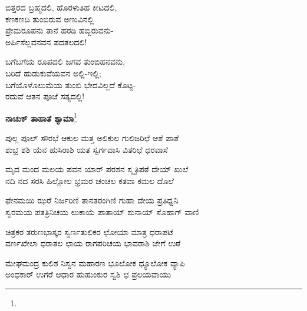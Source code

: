 \begin{myquote}
ಬಿತ್ತರದ ಬ್ರಹ್ಮದಲಿ, ಹೊರಳುತಿಹ ಕೀಟದಲಿ,\\ಕಣಕಣದಿ ತುಂಬಿರುವ ಅಣುವಿನಲ್ಲಿ\\ಪ್ರೇಮರೂಪನು ತಾನೆ ಹರಡಿ ಹಬ್ಬಿರುವನು-\\ಅರ್ಪಿಸೆಲ್ಲವನವನ ಪದತಲದಲಿ!
\end{myquote}

\begin{myquote}
ಬಗೆಬಗೆಯ ರೂಪದಲಿ ಜಗವ ತುಂಬಿಹನವನು,\\ಬರಿದೆ ಹುಡುಕುವೆಯವನ ಅಲ್ಲಿ-ಇಲ್ಲಿ;\\ಬಗೆಯೊಳೊಲುಮೆಯ ತುಂಬಿ ಭೇದವಿಲ್ಲದೆ ಕೊಟ್ಟ-\\ರದುವೆ ಆತನ ಪೂಜೆ ಸತ್ಯದಲ್ಲಿ!
\end{myquote}

\begin{center}
\textbf{ನಾಚುಕ್ ತಾಹಾತೆ ಶ್ಯಾಮಾ}\footnote{}
\end{center}

\begin{myquote}
ಪುಲ್ಲ ಪೂಲ್ ಸೌರಭೆ ಆಕುಲ ಮತ್ತ ಅಲಿಕುಲ ಗುಲಿಜರಿಛೆ ಆಶೆ ಪಾಶೆ\\ಶುಭ್ರ ಶಶಿ ಯೆನ ಹುಸಿರಾಶಿ ಯತ ಸ್ವರ್ಗವಾಸಿ ವಿತರಿಛೆ ಧರವಾಸೆ
\end{myquote}


\begin{myquote}
ಮೃದ ಮಂದ ಮಲಯ ಪವನ ಯಾರ್ ಪರಶನ ಸ್ಮೃತಿಪಠೆ ದೇಯ್ ಖುಲೆ\\ನದಿ ನದ ಸರಸಿ ಹಿಲ್ಲೋಲ ಭ್ರಮರ ಚಂಚಲ ಕತವಾ ಕಮಲ ದೊಲೆ
\end{myquote}


\begin{myquote}
ಫೇನಮಯಿ ಝರೆ ನಿರ್ಜರಿಣಿ ತಾನತರಂಗಿಣಿ ಗುಹಾ ದೇಯ ಪ್ರತಿಧ್ವನಿ\\ಸ್ವರಮಯ ಪತತ್ರಿನಿಚಯ ಲುಕಾಯೆ ಪಾತಾಯ್ ಶುನಾಯ್ ಸೊಹಾಗ್ ವಾಣಿ
\end{myquote}


\begin{myquote}
ಚಿತ್ರಕರ ತರುಣಭಾಸ್ಕರ ಸ್ವರ್ಣತುಲಿಕರ ಛೋಯಾ ಮಾತ್ರ ಧರಾಪಟೆ\\ವರ್ಣಖೇಲಾ ಧರಾತಲ ಛಾಯ ರಾಗಪರಿಚಯ ಭಾವರಾಶಿ ಜೇಗೆ ಉಠೆ
\end{myquote}


\begin{myquote}
ಮೇಘಮಂದ್ರ ಕುಲಿಶ ನಿಸ್ವನ ಮಹಾರಣ ಭೂಲೋಕ ಧ್ಯೂಲೋಕ ವ್ಯಾಪಿ\\ಅಂಧಕಾರ್ ಉಗರೆ ಆಧಾರ ಹುಹುಂಕುರ ಸ್ವಶಿ ಛ ಪ್ರಲಯವಾಯು
\end{myquote}

